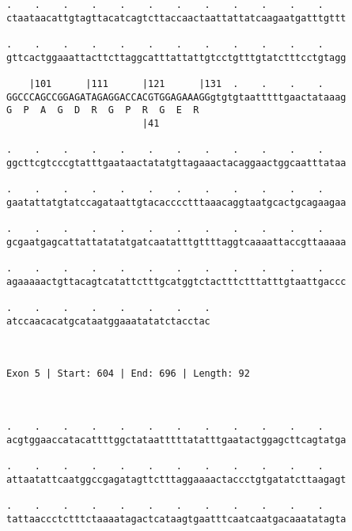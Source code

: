 \documentclass{article}
\begin{document}
\begin{Verbatim}
.    .    .    .    .    .    .    .    .    .    .    .    
ctaataacattgtagttacatcagtcttaccaactaattattatcaagaatgatttgttt
                                                            
.    .    .    .    .    .    .    .    .    .    .    .    
gttcactggaaattacttcttaggcatttattattgtcctgtttgtatctttcctgtagg
                                                            
    |101      |111      |121      |131  .    .    .    .    
GGCCCAGCCGGAGATAGAGGACCACGTGGAGAAAGGgtgtgtaatttttgaactataaag
G  P  A  G  D  R  G  P  R  G  E  R                          
                        |41                                 
  
.    .    .    .    .    .    .    .    .    .    .    .    
ggcttcgtcccgtatttgaataactatatgttagaaactacaggaactggcaatttataa
                                                            
.    .    .    .    .    .    .    .    .    .    .    .    
gaatattatgtatccagataattgtacacccctttaaacaggtaatgcactgcagaagaa
                                                            
.    .    .    .    .    .    .    .    .    .    .    .    
gcgaatgagcattattatatatgatcaatatttgttttaggtcaaaattaccgttaaaaa
                                                            
.    .    .    .    .    .    .    .    .    .    .    .    
agaaaaactgttacagtcatattctttgcatggtctactttctttatttgtaattgaccc
                                                            
.    .    .    .    .    .    .    .
atccaacacatgcataatggaaatatatctacctac
                                    
                                    
 
Exon 5 | Start: 604 | End: 696 | Length: 92



.    .    .    .    .    .    .    .    .    .    .    .    
acgtggaaccatacattttggctataatttttatatttgaatactggagcttcagtatga
                                                            
.    .    .    .    .    .    .    .    .    .    .    .    
attaatattcaatggccgagatagttctttaggaaaactaccctgtgatatcttaagagt
                                                            
.    .    .    .    .    .    .    .    .    .    .    .    
tattaaccctctttctaaaatagactcataagtgaatttcaatcaatgacaaatatagta
                                                            

\end{Verbatim}
\end{document}
